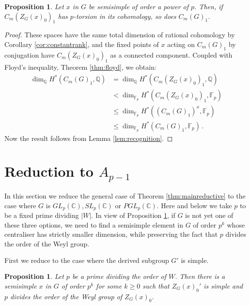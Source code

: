 \documentclass[oneside, 12pt, a4paper]{amsart}
\numberwithin{equation}{section}
\newcommand{\C}{\mathbb{C}}
\theoremstyle{plain}
\newtheorem{proposition}[theorem]{Proposition}
\theoremstyle{definition}
\theoremstyle{remark}
\begin{document}
\begin{proposition} \label{prop:smith}
Let $x$ in $G$ be semisimple of order a power of $p$. Then, if $C_m(Z_G(x)_0)_1$ has $p$-torsion in its cohomology, so does $C_m(G)_1$.
\end{proposition}
\begin{proof}
These spaces have the same total dimension of rational cohomology by Corollary \ref{cor:constantrank}, and the fixed points of $x$ acting on $C_m(G)_1$ by conjugation have $C_m(Z_G(x)_0)_1$ as a connected component. Coupled with Floyd's inequality, Theorem \ref{thm:floyd}, we obtain:
\begin{equation*}
\begin{split}
\dim_{\mathbb{Q}}H^*(C_m(G)_1,\mathbb{Q}) &= \dim_{\mathbb{Q}}H^*(C_m(Z_G(x)_0)_1,\mathbb{Q}) \\&<
\dim_{\mathbb{F}_p}H^*(C_m(Z_G(x)_0)_1,\mathbb{F}_p)\\&\leq \dim_{\mathbb{F}_p}H^*((C_m(G)_1)^x,\mathbb{F}_p)\\&\leq \dim_{\mathbb{F}_p}H^*(C_m(G)_1,\mathbb{F}_p)\, .
\end{split}
\end{equation*}
Now the result follows from Lemma \ref{lem:recognition}.
\end{proof}


\section{Reduction to $A_{p-1}$} \label{sec:reduction}

In this section we reduce the general case of Theorem \ref{thm:mainreductive} to the case where $G$ is $GL_p(\C),SL_p(\C)$ or $PGL_p(\C)$. Here and below we take $p$ to be a fixed prime dividing $|W|$. In view of Proposition \ref{prop:smith}, if $G$ is not yet one of these three options, we need to find a semisimple element in $G$ of order $p^k$ whose centraliser has strictly smaller dimension, while preserving the fact that $p$ divides the order of the Weyl group.

First we reduce to the case where the derived subgroup $G'$ is simple.

\begin{proposition} \label{prop:simple}
Let $p$ be a prime dividing the order of $W$. Then there is a semisimple $x$ in $G$ of order $p^k$ for some $k\geq 0$ such that $Z_G(x)_0'$ is simple and $p$ divides the order of the Weyl group of $Z_G(x)_0$.
\end{proposition}
\end{document}
